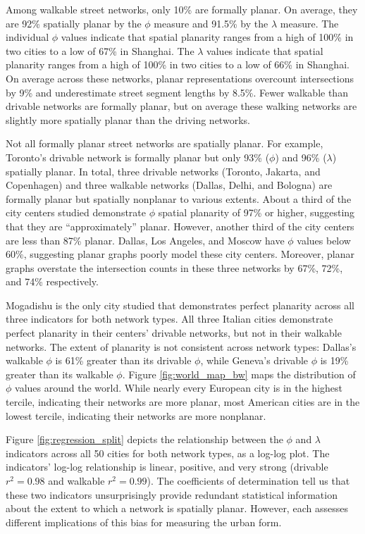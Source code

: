 \documentclass[Afour,sageh,times]{sagej}
\begin{document}
Among walkable street networks, only 10\% are formally planar. On average, they are 92\% spatially planar by the $\phi$ measure and 91.5\% by the $\lambda$ measure. The individual $\phi$ values indicate that spatial planarity ranges from a high of 100\% in two cities to a low of 67\% in Shanghai. The $\lambda$ values indicate that spatial planarity ranges from a high of 100\% in two cities to a low of 66\% in Shanghai. On average across these networks, planar representations overcount intersections by 9\% and underestimate street segment lengths by 8.5\%. Fewer walkable than drivable networks are formally planar, but on average these walking networks are slightly more spatially planar than the driving networks.

Not all formally planar street networks are spatially planar. For example, Toronto's drivable network is formally planar but only 93\% ($\phi$) and 96\% ($\lambda$) spatially planar. In total, three drivable networks (Toronto, Jakarta, and Copenhagen) and three walkable networks (Dallas, Delhi, and Bologna) are formally planar but spatially nonplanar to various extents. About a third of the city centers studied demonstrate $\phi$ spatial planarity of 97\% or higher, suggesting that they are \enquote{approximately} planar. However, another third of the city centers are less than 87\% planar. Dallas, Los Angeles, and Moscow have $\phi$ values below 60\%, suggesting planar graphs poorly model these city centers. Moreover, planar graphs overstate the intersection counts in these three networks by 67\%, 72\%, and 74\% respectively.

Mogadishu is the only city studied that demonstrates perfect planarity across all three indicators for both network types. All three Italian cities demonstrate perfect planarity in their centers' drivable networks, but not in their walkable networks. The extent of planarity is not consistent across network types: Dallas's walkable $\phi$ is 61\% greater than its drivable $\phi$, while Geneva's drivable $\phi$ is 19\% greater than its walkable $\phi$. Figure \ref{fig:world_map_bw} maps the distribution of $\phi$ values around the world. While nearly every European city is in the highest tercile, indicating their networks are more planar, most American cities are in the lowest tercile, indicating their networks are more nonplanar.

Figure \ref{fig:regression_split} depicts the relationship between the $\phi$ and $\lambda$ indicators across all 50 cities for both network types, as a log-log plot. The indicators' log-log relationship is linear, positive, and very strong (drivable $r^2=0.98$ and walkable $r^2=0.99$). The coefficients of determination tell us that these two indicators unsurprisingly provide redundant statistical information about the extent to which a network is spatially planar. However, each assesses different implications of this bias for measuring the urban form.
\end{document}
